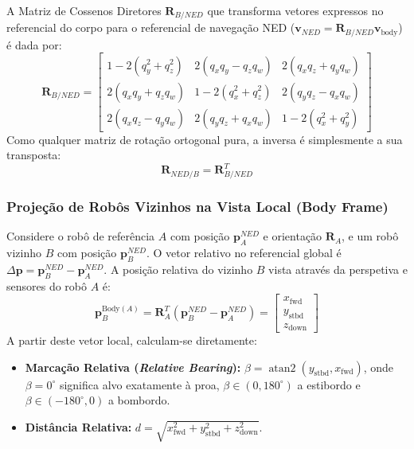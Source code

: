 \documentclass[11pt,a4paper]{article}
\begin{document}
A Matriz de Cossenos Diretores $\mathbf{R}_{B/NED}$ que transforma vetores expressos no referencial do corpo para o referencial de navegação NED ($\mathbf{v}_{NED} = \mathbf{R}_{B/NED} \mathbf{v}_{\text{body}}$) é dada por:
\begin{equation}
    \label{eq:quat_to_rot}
    \mathbf{R}_{B/NED} = \begin{bmatrix}
        1 - 2(q_y^2 + q_z^2) & 2(q_x q_y - q_z q_w) & 2(q_x q_z + q_y q_w) \\
        2(q_x q_y + q_z q_w) & 1 - 2(q_x^2 + q_z^2) & 2(q_y q_z - q_x q_w) \\
        2(q_x q_z - q_y q_w) & 2(q_y q_z + q_x q_w) & 1 - 2(q_x^2 + q_y^2)
    \end{bmatrix}
\end{equation}
Como qualquer matriz de rotação ortogonal pura, a inversa é simplesmente a sua transposta:
\begin{equation}
    \mathbf{R}_{NED/B} = \mathbf{R}_{B/NED}^T
\end{equation}

\subsubsection{Projeção de Robôs Vizinhos na Vista Local (Body Frame)}
Considere o robô de referência $A$ com posição $\mathbf{p}_A^{NED}$ e orientação $\mathbf{R}_A$, e um robô vizinho $B$ com posição $\mathbf{p}_B^{NED}$. O vetor relativo no referencial global é $\Delta \mathbf{p} = \mathbf{p}_B^{NED} - \mathbf{p}_A^{NED}$.
A posição relativa do vizinho $B$ vista através da perspetiva e sensores do robô $A$ é:
\begin{equation}
    \label{eq:body_rel_transform}
    \mathbf{p}_B^{\text{Body}(A)} = \mathbf{R}_A^T \left( \mathbf{p}_B^{NED} - \mathbf{p}_A^{NED} \right) = \begin{bmatrix} x_{\text{fwd}} \\ y_{\text{stbd}} \\ z_{\text{down}} \end{bmatrix}
\end{equation}
A partir deste vetor local, calculam-se diretamente:
\begin{itemize}
    \item \textbf{Marcação Relativa (\textit{Relative Bearing}):} $\beta = \operatorname{atan2}(y_{\text{stbd}}, x_{\text{fwd}})$, onde $\beta = 0^\circ$ significa alvo exatamente à proa, $\beta \in (0, 180^\circ)$ a estibordo e $\beta \in (-180^\circ, 0)$ a bombordo.
    \item \textbf{Distância Relativa:} $d = \sqrt{x_{\text{fwd}}^2 + y_{\text{stbd}}^2 + z_{\text{down}}^2}$.
\end{itemize}
\end{document}

